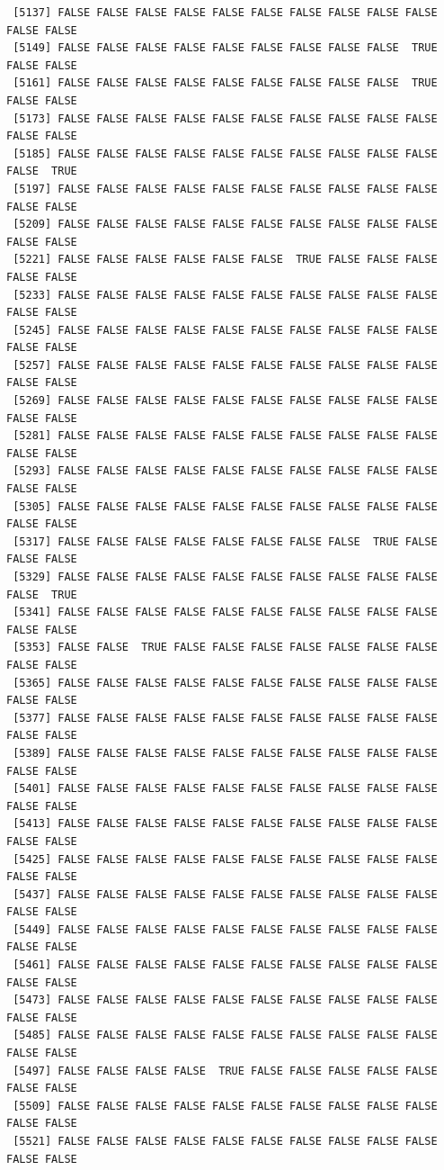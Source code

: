 \documentclass[
  a4paper,
  DIV=11,
  numbers=noendperiod]{scrartcl}
\begin{document}
\begin{verbatim}
 [5137] FALSE FALSE FALSE FALSE FALSE FALSE FALSE FALSE FALSE FALSE FALSE FALSE
 [5149] FALSE FALSE FALSE FALSE FALSE FALSE FALSE FALSE FALSE  TRUE FALSE FALSE
 [5161] FALSE FALSE FALSE FALSE FALSE FALSE FALSE FALSE FALSE  TRUE FALSE FALSE
 [5173] FALSE FALSE FALSE FALSE FALSE FALSE FALSE FALSE FALSE FALSE FALSE FALSE
 [5185] FALSE FALSE FALSE FALSE FALSE FALSE FALSE FALSE FALSE FALSE FALSE  TRUE
 [5197] FALSE FALSE FALSE FALSE FALSE FALSE FALSE FALSE FALSE FALSE FALSE FALSE
 [5209] FALSE FALSE FALSE FALSE FALSE FALSE FALSE FALSE FALSE FALSE FALSE FALSE
 [5221] FALSE FALSE FALSE FALSE FALSE FALSE  TRUE FALSE FALSE FALSE FALSE FALSE
 [5233] FALSE FALSE FALSE FALSE FALSE FALSE FALSE FALSE FALSE FALSE FALSE FALSE
 [5245] FALSE FALSE FALSE FALSE FALSE FALSE FALSE FALSE FALSE FALSE FALSE FALSE
 [5257] FALSE FALSE FALSE FALSE FALSE FALSE FALSE FALSE FALSE FALSE FALSE FALSE
 [5269] FALSE FALSE FALSE FALSE FALSE FALSE FALSE FALSE FALSE FALSE FALSE FALSE
 [5281] FALSE FALSE FALSE FALSE FALSE FALSE FALSE FALSE FALSE FALSE FALSE FALSE
 [5293] FALSE FALSE FALSE FALSE FALSE FALSE FALSE FALSE FALSE FALSE FALSE FALSE
 [5305] FALSE FALSE FALSE FALSE FALSE FALSE FALSE FALSE FALSE FALSE FALSE FALSE
 [5317] FALSE FALSE FALSE FALSE FALSE FALSE FALSE FALSE  TRUE FALSE FALSE FALSE
 [5329] FALSE FALSE FALSE FALSE FALSE FALSE FALSE FALSE FALSE FALSE FALSE  TRUE
 [5341] FALSE FALSE FALSE FALSE FALSE FALSE FALSE FALSE FALSE FALSE FALSE FALSE
 [5353] FALSE FALSE  TRUE FALSE FALSE FALSE FALSE FALSE FALSE FALSE FALSE FALSE
 [5365] FALSE FALSE FALSE FALSE FALSE FALSE FALSE FALSE FALSE FALSE FALSE FALSE
 [5377] FALSE FALSE FALSE FALSE FALSE FALSE FALSE FALSE FALSE FALSE FALSE FALSE
 [5389] FALSE FALSE FALSE FALSE FALSE FALSE FALSE FALSE FALSE FALSE FALSE FALSE
 [5401] FALSE FALSE FALSE FALSE FALSE FALSE FALSE FALSE FALSE FALSE FALSE FALSE
 [5413] FALSE FALSE FALSE FALSE FALSE FALSE FALSE FALSE FALSE FALSE FALSE FALSE
 [5425] FALSE FALSE FALSE FALSE FALSE FALSE FALSE FALSE FALSE FALSE FALSE FALSE
 [5437] FALSE FALSE FALSE FALSE FALSE FALSE FALSE FALSE FALSE FALSE FALSE FALSE
 [5449] FALSE FALSE FALSE FALSE FALSE FALSE FALSE FALSE FALSE FALSE FALSE FALSE
 [5461] FALSE FALSE FALSE FALSE FALSE FALSE FALSE FALSE FALSE FALSE FALSE FALSE
 [5473] FALSE FALSE FALSE FALSE FALSE FALSE FALSE FALSE FALSE FALSE FALSE FALSE
 [5485] FALSE FALSE FALSE FALSE FALSE FALSE FALSE FALSE FALSE FALSE FALSE FALSE
 [5497] FALSE FALSE FALSE FALSE  TRUE FALSE FALSE FALSE FALSE FALSE FALSE FALSE
 [5509] FALSE FALSE FALSE FALSE FALSE FALSE FALSE FALSE FALSE FALSE FALSE FALSE
 [5521] FALSE FALSE FALSE FALSE FALSE FALSE FALSE FALSE FALSE FALSE FALSE FALSE

\end{verbatim}
\end{document}
